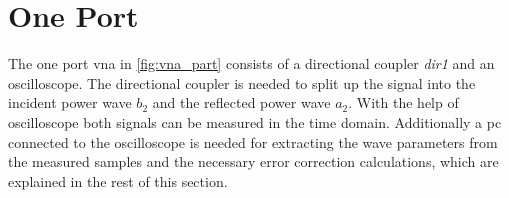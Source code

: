 \documentclass[12pt,a4paper,parskip=full,abstract=true,BCOR=12mm,twoside,open=right]{scrreprt}
\def\device#1{\textit{#1}}
\begin{document}

\section{One Port }
\label{sec:vna}

The one port \gls{vna} in \cref{fig:vna_part} consists of a directional coupler
\device{dir1} and an oscilloscope. The directional coupler is needed to split up
the signal into the incident power wave $b_{2}$ and the reflected power
wave $a_{2}$. With the help of oscilloscope both signals can be measured in the
time domain. Additionally a \gls{pc} connected to the oscilloscope is needed
for extracting the wave parameters from the measured samples and the necessary
error correction calculations, which are explained in the rest of this section.
\end{document}

